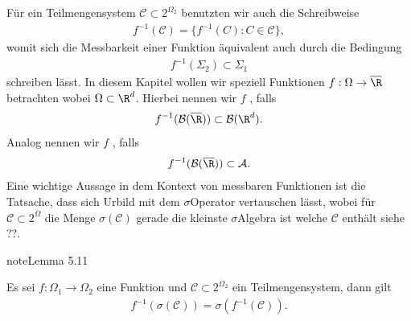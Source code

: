 \documentclass[letterpaper,10pt,english]{jupyterBook}
\begin{document}
\sphinxAtStartPar
Für ein Teilmengensystem \(\mathcal{C}\subset 2^{\Omega_2}\) benutzten wir auch die Schreibweise
\begin{equation*}
\begin{split}f^{-1}(\mathcal{C}) = \{ f^{-1}(C): C\in\mathcal{C}\},\end{split}
\end{equation*}
\sphinxAtStartPar
womit sich die Messbarkeit einer Funktion äquivalent auch durch die Bedingung
\begin{equation*}
\begin{split}f^{-1}(\Sigma_2)\subset\Sigma_1\end{split}
\end{equation*}
\sphinxAtStartPar
schreiben lässt. In diesem Kapitel wollen wir speziell Funktionen \(f:\Omega\to\overline{\R}\) betrachten wobei \(\Omega\subset\R^d\). Hierbei nennen wir \(f\) , falls
\begin{equation*}
\begin{split}f^{-1}(\mathcal{B}(\overline{\R}))\subset \mathcal{B}(\R^d).\end{split}
\end{equation*}
\sphinxAtStartPar
Analog nennen wir \(f\) , falls
\begin{equation*}
\begin{split}f^{-1}(\mathcal{B}(\overline{\R}))\subset \mathcal{A}.\end{split}
\end{equation*}
\sphinxAtStartPar
Eine wichtige Aussage in dem Kontext von messbaren Funktionen ist die Tatsache, dass sich Urbild mit dem \(\sigma\)\sphinxhyphen{}Operator vertauschen lässt, wobei für \(\mathcal{C}\subset 2^\Omega\) die Menge \(\sigma(\mathcal{C})\) gerade die kleinste \(\sigma\)\sphinxhyphen{}Algebra ist welche \(\mathcal{C}\) enthält siehe ??.
\label{masstheorie/lebesgue_integral:lemma-1}
\begin{sphinxadmonition}{note}{Lemma 5.11}



\sphinxAtStartPar
Es sei \(f:\Omega_1\to\Omega_2\) eine Funktion und \(\mathcal{C}\subset 2^{\Omega_2}\) ein Teilmengensystem, dann gilt
\begin{equation*}
\begin{split}f^{-1}(\sigma(\mathcal{C})) = \sigma(f^{-1}(\mathcal{C})).\end{split}
\end{equation*}\end{sphinxadmonition}
\end{document}
